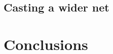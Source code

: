 \documentclass{acm_proc_article-sp}
\begin{document}




\subsection{Casting a wider net}



\section{Conclusions}





\balancecolumns
\end{document}
